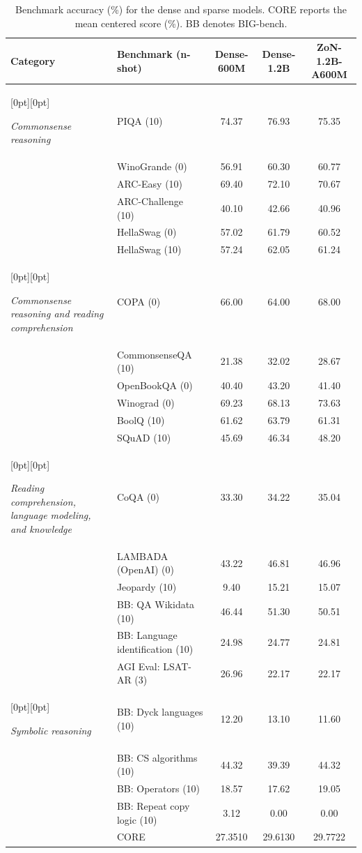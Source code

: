 \begin{table}[t]
\caption{Benchmark accuracy (\%) for the dense and sparse models.
CORE reports the mean centered score (\%). BB denotes BIG-bench.}
\label{tab:zon_benchmarks}
\begin{center}
\small
\setlength{\tabcolsep}{2pt}
\newcommand{\zoncategorymultirow}[2]{%
  \raisebox{\dimexpr-#1\ht\strutbox/2-#1\dp\strutbox/2+\ht\strutbox/2+\dp\strutbox/2\relax}[0pt][0pt]{%
    \parbox[c]{82pt}{\raggedright\itshape #2}}}
\begin{tabular}{@{}llccc@{}}
\toprule
\textbf{Category} & \textbf{Benchmark (n-shot)} & \textbf{Dense-600M} & \textbf{Dense-1.2B} & \textbf{ZoN-1.2B-A600M} \\
\midrule
\zoncategorymultirow{6}{Commonsense reasoning} & PIQA (10) & 74.37 & 76.93 & 75.35 \\
 & WinoGrande (0) & 56.91 & 60.30 & 60.77 \\
 & ARC-Easy (10) & 69.40 & 72.10 & 70.67 \\
 & ARC-Challenge (10) & 40.10 & 42.66 & 40.96 \\
 & HellaSwag (0) & 57.02 & 61.79 & 60.52 \\
 & HellaSwag (10) & 57.24 & 62.05 & 61.24 \\
\midrule
\zoncategorymultirow{6}{Commonsense reasoning and reading comprehension} & COPA (0) & 66.00 & 64.00 & 68.00 \\
 & CommonsenseQA (10) & 21.38 & 32.02 & 28.67 \\
 & OpenBookQA (0) & 40.40 & 43.20 & 41.40 \\
 & Winograd (0) & 69.23 & 68.13 & 73.63 \\
 & BoolQ (10) & 61.62 & 63.79 & 61.31 \\
 & SQuAD (10) & 45.69 & 46.34 & 48.20 \\
\midrule
\zoncategorymultirow{6}{Reading comprehension, language modeling, and knowledge} & CoQA (0) & 33.30 & 34.22 & 35.04 \\
 & LAMBADA (OpenAI) (0) & 43.22 & 46.81 & 46.96 \\
 & Jeopardy (10) & 9.40 & 15.21 & 15.07 \\
 & BB: QA Wikidata (10) & 46.44 & 51.30 & 50.51 \\
 & BB: Language identification (10) & 24.98 & 24.77 & 24.81 \\
 & AGI Eval: LSAT-AR (3) & 26.96 & 22.17 & 22.17 \\
\midrule
\zoncategorymultirow{4}{Symbolic reasoning} & BB: Dyck languages (10) & 12.20 & 13.10 & 11.60 \\
 & BB: CS algorithms (10) & 44.32 & 39.39 & 44.32 \\
 & BB: Operators (10) & 18.57 & 17.62 & 19.05 \\
 & BB: Repeat copy logic (10) & 3.12 & 0.00 & 0.00 \\
\midrule
\rowcolor{ratioDenseD!40!white}
 & CORE & 27.3510 & 29.6130 & 29.7722 \\
\bottomrule
\end{tabular}
\end{center}
\end{table}
